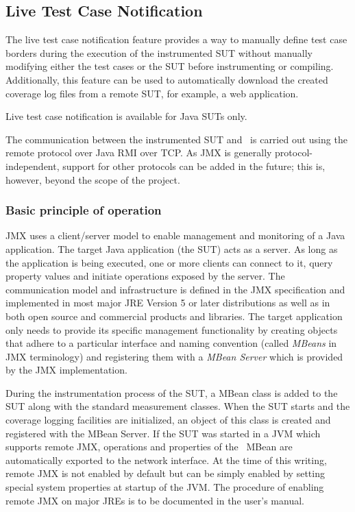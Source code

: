 \subsection{Live Test Case Notification}
\label{sec:fr:Live_Test_Case_Notification}

The live test case notification feature provides a way to manually
define test case borders during the execution of the instrumented SUT
without manually modifying either the test cases or the SUT before
instrumenting or compiling. Additionally, this feature can be used to
automatically download the created coverage log files from a remote
SUT, for example, a web application.

Live test case notification is available for Java SUTs only.

The communication between the instrumented SUT and \gbt\ is carried
out using the
 remote protocol over Java RMI over
TCP. As JMX is generally protocol-independent, support for other
protocols can be added in the future; this is, however, beyond the
scope of the \gbt project.

\subsubsection{Basic principle of operation}
\label{sec:fr_Live_Basic_Principle}
JMX uses a client/server model to enable management and monitoring of
a Java application. The target Java application (the SUT) acts as a
server. As long as the application is being executed, one or more
clients can connect to it, query property values and initiate
operations exposed by the server. The communication model and
infrastructure is defined in the JMX specification and implemented in
most major JRE Version 5 or later distributions as well as in both
open source and commercial products and libraries. The target
application only needs to provide its specific management
functionality by creating objects that adhere to a particular
interface and naming convention (called \emph{MBeans} in JMX
terminology) and registering them with a \emph{MBean Server} which is
provided by the JMX implementation.

During the instrumentation process of the SUT, a MBean class is added
to the SUT along with the standard measurement classes. When the SUT
starts and the coverage logging facilities are initialized, an object
of this class is created and registered with the MBean Server. If the
SUT was started in a JVM which supports remote JMX, operations and
properties of the \gbt\ MBean are automatically exported to the
network interface. At the time of this writing, remote JMX is not
enabled by default but can be simply enabled by setting special system
properties at startup of the JVM. The procedure of enabling remote JMX
on major JREs is to be documented in the user's manual.

